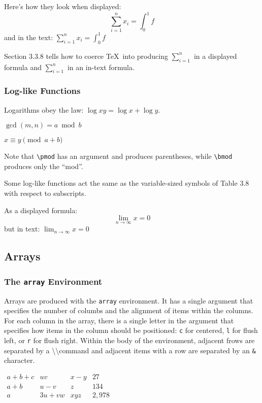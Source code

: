 \documentclass[twocolumn]{book}        %
\begin{document}
Here's how they look when displayed:
\[\sum_{i=1}^{n} x_{i} = \int_{0}^{1}f \]
and in the text:
\(\sum_{i=1}^{n} x_{i} = \int_{0}^{1}f \)

Section 3.3.8 tells how to coerce \TeX\ into producing \(\sum_{i=1}^{n}\) 
in a displayed formula and \(\sum_{i=1}^{n}\)  in an in-text formula.

\subsubsection{Log-like Functions}

Logarithms obey the law: \( \log xy = \log x + \log y \).

\( \gcd(m,n) = a \bmod b \) 

\( x \equiv y \pmod{a+b} \)

Note that \texttt{\textbackslash pmod} has an argument and produces parentheses, while 
\texttt{\textbackslash bmod} produces only the ``mod''.

Some log-like functions act the same as the variable-sized symbols of Table 3.8 with 
respect to subscripts.

As a displayed formula:
\[ \lim_{n \rightarrow \infty} x = 0 \]
but in text:
\( \lim_{n \rightarrow \infty} x = 0 \) 

\subsection{Arrays}

\subsubsection{The \texttt{array} Environment}

Arrays are produced with the \texttt{array} environment. It has a single argument that 
specifies the number of columbs and the alignment of items within the columns.
For each column in the array, there is a single letter in the argument that specifies how
items in the column should be positioned: \texttt{c} for centered, \texttt{l} for flush left,
or \texttt{r} for flush right. Within the body of the environment, adjacent frows are separated
by a \textbackslash \textbackslash command and adjacent items with a row are separated by an 
\texttt{\&} character.

\hfill \break 
\( \begin{array}{clcr}
    a+b+c   & uv    & x-y   & 27    \\
    a+b     & u-v   & z     & 134   \\
    a       & 3u+vw & xyz   & 2,978 \\
\end{array} \)
\end{document}
